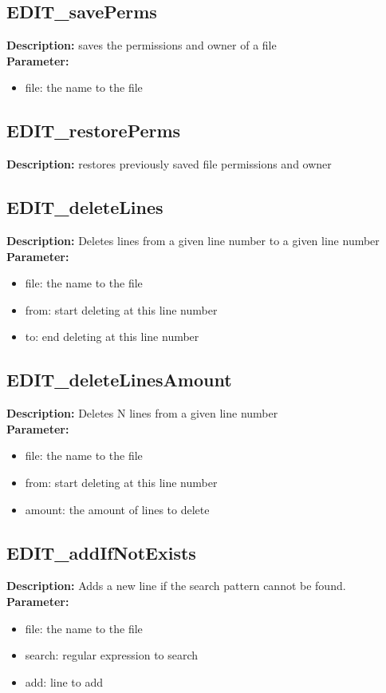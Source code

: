\subsection{EDIT\_savePerms}
\textbf{Description:} saves the permissions and owner of a file\\
\textbf{Parameter:}
\begin{itemize}
\item file: the name to the file
\end{itemize}

\subsection{EDIT\_restorePerms}
\textbf{Description:} restores previously saved file permissions and owner\\

\subsection{EDIT\_deleteLines}
\textbf{Description:} Deletes lines from a given line number to a given line number\\
\textbf{Parameter:}
\begin{itemize}
\item file: the name to the file
\item from: start deleting at this line number
\item to: end deleting at this line number
\end{itemize}

\subsection{EDIT\_deleteLinesAmount}
\textbf{Description:} Deletes N lines from a given line number\\
\textbf{Parameter:}
\begin{itemize}
\item file: the name to the file
\item from: start deleting at this line number
\item amount: the amount of lines to delete
\end{itemize}

\subsection{EDIT\_addIfNotExists}
\textbf{Description:} Adds a new line if the search pattern cannot be found.\\
\textbf{Parameter:}
\begin{itemize}
\item file: the name to the file
\item search: regular expression to search
\item add: line to add
\end{itemize}


